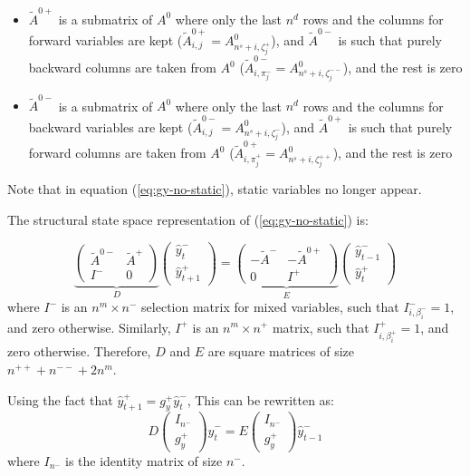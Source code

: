\documentclass[11pt,a4paper]{article}
\begin{document}
\begin{itemize}
\item $\tilde{A}^{0+}$ is a submatrix of $A^0$ where only the last $n^d$ rows and the columns for forward variables are kept ($\tilde{A}^{0+}_{i,j} = A^0_{n^s+i, \zeta^+_j}$), and $\tilde{A}^{0-}$ is such that purely backward columns are taken from $A^0$ ($\tilde{A}^{0-}_{i,\pi^-_j} = A^0_{n^s+i,\zeta^{--}_j}$), and the rest is zero
\item $\tilde{A}^{0-}$ is a submatrix of $A^0$ where only the last $n^d$ rows and the columns for backward variables are kept ($\tilde{A}^{0-}_{i,j} = A^0_{n^s+i, \zeta^-_j}$), and $\tilde{A}^{0+}$ is such that purely forward columns are taken from $A^0$ ($\tilde{A}^{0+}_{i,\pi^+_j} = A^0_{n^s+i,\zeta^{++}_j}$), and the rest is zero
\end{itemize}

Note that in equation (\ref{eq:gy-no-static}), static variables no longer appear.

The structural state space representation of (\ref{eq:gy-no-static}) is:

\begin{equation*}
\underbrace{
  \left(
    \begin{matrix}
      \tilde{A}^{0-} & \tilde{A}^+ \\
      I^- & 0
    \end{matrix}
  \right)
}_D
\left(
  \begin{matrix}
    \hat{y}^-_t \\
    \hat{y}^+_{t+1}
  \end{matrix}
\right)
=
\underbrace{
  \left(
    \begin{matrix}
      -\tilde{A}^- & -\tilde{A}^{0+} \\
      0 & I^+
    \end{matrix}
  \right)
}_E
\left(
  \begin{matrix}
    \hat{y}^-_{t-1} \\
    \hat{y}^+_t
  \end{matrix}
\right)
\end{equation*}
where $I^-$ is an $n^m \times n^-$ selection matrix for mixed variables, such that $I^-_{i,\beta^-_i}=1$, and zero otherwise. Similarly, $I^+$ is an $n^m \times n^+$ matrix, such that $I^+_{i,\beta^+_i}=1$, and zero otherwise. Therefore, $D$ and $E$ are square matrices of size $n^{++}+n^{--}+2n^m$.

Using the fact that $\hat{y}^+_{t+1} = g^+_y \hat{y}^-_t$, This can be rewritten as:
\begin{equation}
\label{eq:state-space}
  D
  \left(
    \begin{matrix}
      I_{n^-} \\
      g^+_y
    \end{matrix}
  \right)
  \hat{y}^-_t
  =
  E
  \left(
    \begin{matrix}
      I_{n^-} \\
      g^+_y
    \end{matrix}
  \right)
  \hat{y}^-_{t-1}
\end{equation}
where $I_{n^-}$ is the identity matrix of size $n^-$.
\end{document}
